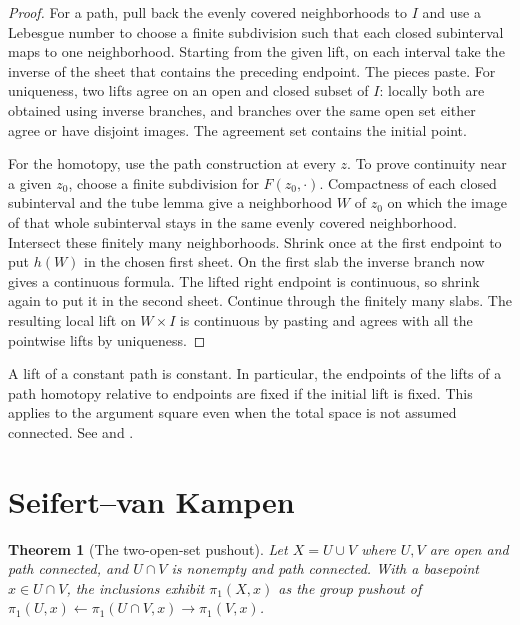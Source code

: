 \documentclass[11pt,oneside,openany]{book}
\theoremstyle{plain}
\newtheorem{theorem}{Theorem}[chapter]
\theoremstyle{definition}
\theoremstyle{remark}
\begin{document}
\begin{proof}
For a path, pull back the evenly covered neighborhoods to
\(I\) and use a Lebesgue number to choose a finite subdivision
such that each closed subinterval maps to one neighborhood.
Starting from the given lift, on each interval take the
inverse of the sheet that contains the preceding endpoint.
The pieces paste. For uniqueness, two lifts agree on an open
and closed subset of \(I\): locally both are obtained using
inverse branches, and branches over the same open set either
agree or have disjoint images. The agreement set contains the
initial point.

For the homotopy, use the path construction at every \(z\).
To prove continuity near a given \(z_0\), choose a finite
subdivision for \(F(z_0,\cdot)\). Compactness of each closed
subinterval and the tube lemma give a neighborhood \(W\) of
\(z_0\) on which the image of that whole subinterval stays in
the same evenly covered neighborhood. Intersect these
finitely many neighborhoods. Shrink once at the first endpoint
to put \(h(W)\) in the chosen first sheet. On the first slab
the inverse branch now gives a continuous formula. The lifted
right endpoint is continuous, so shrink again to put it in
the second sheet. Continue through the finitely many slabs.
The resulting local lift on \(W\times I\) is continuous by
pasting and agrees with all the pointwise lifts by uniqueness.
\end{proof}

A lift of a constant path is constant. In particular, the
endpoints of the lifts of a path homotopy relative to endpoints
are fixed if the initial lift is fixed. This applies to the
argument square even when the total space is not assumed
connected. See \cite[Section 1.3]{Hatcher} and
\cite[Sections 53--54]{MT}.

\section{Seifert--van Kampen}\label{p202:T03}

\begin{theorem}[The two-open-set pushout]
\label{thm:p202-van-kampen}
Let \(X=U\cup V\) where \(U,V\) are open and path connected,
and \(U\cap V\) is nonempty and path connected. With a basepoint
\(x\in U\cap V\), the inclusions exhibit \(\pi_1(X,x)\) as
the group pushout of \(\pi_1(U,x)\leftarrow\pi_1(U\cap V,x)
\to\pi_1(V,x)\).
\end{theorem}
\end{document}
